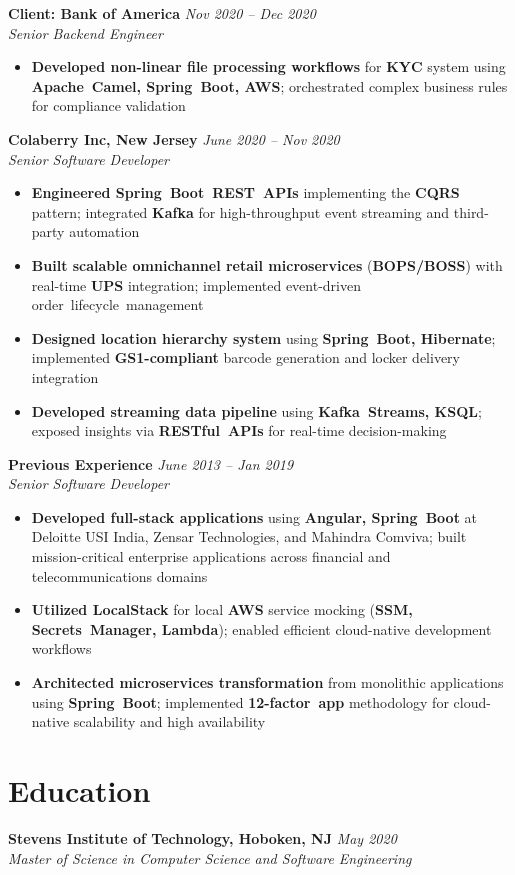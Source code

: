 \documentclass[11pt,a4paper]{article}
\newcommand{\resumeItem}[1]{\item\small{#1}}
\newcommand{\resumeItemList}[1]{\begin{itemize}[leftmargin=0.5in, itemsep=0.25em, parsep=0pt, partopsep=0pt, topsep=0.25em]
    \small
    #1
\end{itemize}}
\begin{document}
\textbf{Client: Bank of America} \hfill \textit{Nov 2020 -- Dec 2020}\\
\textit{Senior Backend Engineer}
\resumeItemList{
    \resumeItem{\textbf{Developed non-linear file processing workflows} for \textbf{KYC} system using \textbf{Apache~Camel, Spring~Boot, AWS}; orchestrated complex business rules for compliance validation}
}

\textbf{Colaberry Inc, New Jersey} \hfill \textit{June 2020 -- Nov 2020}\\
\textit{Senior Software Developer}
\resumeItemList{
    \resumeItem{\textbf{Engineered Spring~Boot~REST~APIs} implementing the \textbf{CQRS} pattern; integrated \textbf{Kafka} for high-throughput event streaming and third-party automation}
    \resumeItem{\textbf{Built scalable omnichannel retail microservices} (\textbf{BOPS/BOSS}) with real-time \textbf{UPS} integration; implemented event-driven order~lifecycle~management}
    \resumeItem{\textbf{Designed location hierarchy system} using \textbf{Spring~Boot, Hibernate}; implemented \textbf{GS1-compliant} barcode generation and locker delivery integration}
    \resumeItem{\textbf{Developed streaming data pipeline} using \textbf{Kafka~Streams, KSQL}; exposed insights via \textbf{RESTful~APIs} for real-time decision-making}
}
\vspace{0.4em}

\textbf{Previous Experience} \hfill \textit{June 2013 -- Jan 2019}\\
\textit{Senior Software Developer}
\resumeItemList{
    \resumeItem{\textbf{Developed full-stack applications} using \textbf{Angular, Spring~Boot} at Deloitte USI India, Zensar Technologies, and Mahindra Comviva; built mission-critical enterprise applications across financial and telecommunications domains}
    \resumeItem{\textbf{Utilized \textbf{LocalStack}} for local \textbf{AWS} service mocking (\textbf{SSM, Secrets~Manager, Lambda}); enabled efficient cloud-native development workflows}
    \resumeItem{\textbf{Architected microservices transformation} from monolithic applications using \textbf{Spring~Boot}; implemented \textbf{12-factor~app} methodology for cloud-native scalability and high availability}
}

\section{Education}
\textbf{Stevens Institute of Technology, Hoboken, NJ} \hfill \textit{May 2020}\\
\textit{Master of Science in Computer Science and Software Engineering}
\end{document}
